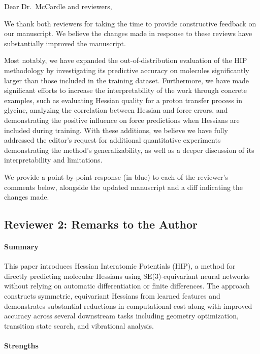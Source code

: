 \documentclass[pdflatex,sn-mathphys-num]{sn-jnl}
\begin{document}
{\color{mycustomcolour}
\noindent Dear Dr.~McCardle and reviewers,

We thank both reviewers for taking the time to provide constructive feedback on our manuscript. We believe the changes made in response to these reviews have substantially improved the manuscript. 

Most notably, we have expanded the out-of-distribution evaluation of the HIP methodology by investigating its predictive accuracy on molecules significantly larger than those included in the training dataset. Furthermore, we have made significant efforts to increase the interpretability of the work through concrete examples, such as evaluating Hessian quality for a proton transfer process in glycine, analyzing the correlation between Hessian and force errors, and demonstrating the positive influence on force predictions when Hessians are included during training. With these additions, we believe we have fully addressed the editor's request for additional quantitative experiments demonstrating the method's generalizability, as well as a deeper discussion of its interpretability and limitations.

We provide a point-by-point response (in blue) to each of the reviewer's comments below, alongside the updated manuscript and a diff indicating the changes made.
}

\subsection*{Reviewer 2: Remarks to the Author}
\paragraph{Summary}

\noindent This paper introduces Hessian Interatomic Potentials (HIP), a method for directly predicting molecular Hessians using SE(3)-equivariant neural networks without relying on automatic differentiation or finite differences. The approach constructs symmetric, equivariant Hessians from learned features and demonstrates substantial reductions in computational cost along with improved accuracy across several downstream tasks including geometry optimization, transition state search, and vibrational analysis.

\paragraph{Strengths}
\end{document}
